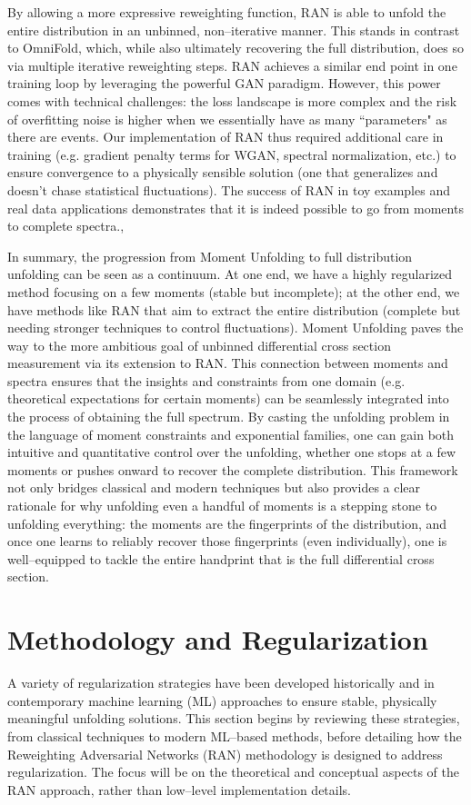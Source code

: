         By allowing a more expressive reweighting function, RAN is able to unfold the entire distribution in an unbinned, non--iterative manner.
        This stands in contrast to OmniFold, which, while also ultimately recovering the full distribution, does so via multiple iterative reweighting steps.
        RAN achieves a similar end point in one training loop by leveraging the powerful GAN paradigm.
        However, this power comes with technical challenges: the loss landscape is more complex and the risk of overfitting noise is higher when we essentially have as many ``parameters" as there are events.
        Our implementation of RAN thus required additional care in training (e.g. gradient penalty terms for WGAN, spectral normalization, etc.) to ensure convergence to a physically sensible solution (one that generalizes and doesn’t chase statistical fluctuations).
        The success of RAN in toy examples and real data applications demonstrates that it is indeed possible to go from moments to complete spectra.,

In summary, the progression from Moment Unfolding to full distribution unfolding can be seen as a continuum.
%
At one end, we have a highly regularized method focusing on a few moments (stable but incomplete); at the other end, we have methods like RAN that aim to extract the entire distribution (complete but needing stronger techniques to control fluctuations).
%
Moment Unfolding paves the way to the more ambitious goal of unbinned differential cross section measurement via its extension to RAN.
%
This connection between moments and spectra ensures that the insights and constraints from one domain (e.g. theoretical expectations for certain moments) can be seamlessly integrated into the process of obtaining the full spectrum.
%
By casting the unfolding problem in the language of moment constraints and exponential families, one can gain both intuitive and quantitative control over the unfolding, whether one stops at a few moments or pushes onward to recover the complete distribution.
%
This framework not only bridges classical and modern techniques but also provides a clear rationale for why unfolding even a handful of moments is a stepping stone to unfolding everything: the moments are the fingerprints of the distribution, and once one learns to reliably recover those fingerprints (even individually), one is well--equipped to tackle the entire handprint that is the full differential cross section.

\section{Methodology and Regularization}
    A variety of regularization strategies have been developed historically and in contemporary machine learning (ML) approaches to ensure stable, physically meaningful unfolding solutions.
    This section begins by reviewing these strategies, from classical techniques to modern ML--based methods, before detailing how the Reweighting Adversarial Networks (RAN) methodology is designed to address regularization.
    The focus will be on the theoretical and conceptual aspects of the RAN approach, rather than low--level implementation details.

